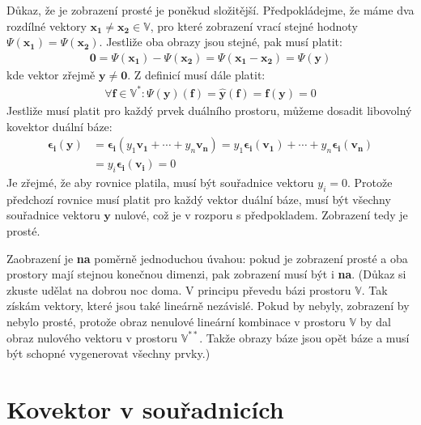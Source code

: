 \documentclass[a5paper,12pt]{amsbook}
\theoremstyle{definition}
\newcommand{\myvec}[1]{\mathbf{#1}}
\newcommand{\myspace}[1]{\mathbb{#1}}
\newcommand{\mydual}[1]{\myspace{#1^{*}}}
\newcommand{\mydouble}[1]{\myspace{#1^{**}}}
\newcommand{\mycocovec}[1]{\myvec{\widehat{#1}}}
\begin{document}
\medskip\noindent
Důkaz, že je zobrazení prosté je poněkud složitější. Předpokládejme, že máme dva rozdílné vektory
$\myvec{x_1}\neq\myvec{x_2}\in\myspace{V}$, pro které zobrazení vrací stejné hodnoty
$\Psi(\myvec{x_1}) = \Psi(\myvec{x_2})$. Jestliže oba obrazy jsou stejné, pak musí platit:
\begin{equation*}
\begin{split}
\myvec{0} = \Psi(\myvec{x_1}) - \Psi(\myvec{x_2}) = \Psi(\myvec{x_1} - \myvec{x_2}) = \Psi(\myvec{y})
\end{split}
\end{equation*}
kde vektor zřejmě $\myvec{y}\neq\myvec{0}$. Z definicí musí dále platit:
\begin{equation*}
\begin{split}
\forall \myvec{f}\in\mydual{V}: \Psi(\myvec{y})(\myvec{f}) = \mycocovec{y}(\myvec{f}) 
    = \myvec{f}(\myvec{y}) = 0
\end{split}
\end{equation*}
Jestliže musí platit pro každý prvek duálního prostoru, můžeme dosadit libovolný kovektor
duální báze:
\begin{equation*}
\begin{split}
\myvec{\epsilon_i}(\myvec{y}) &= \myvec{\epsilon_i}(y_{1}\myvec{v_1} + \cdots + y_{n}\myvec{v_n})
    = y_{1}\myvec{\epsilon_i}(\myvec{v_1}) + \cdots + y_{n}\myvec{\epsilon_i}(\myvec{v_n}) \\
    &= y_{i}\myvec{\epsilon_i}(\myvec{v_i}) = 0
\end{split}
\end{equation*}
Je zřejmé, že aby rovnice platila, musí být souřadnice vektoru $y_i = 0$. Protože předchozí rovnice
musí platit pro každý vektor duální báze, musí být všechny souřadnice vektoru $\myvec{y}$ nulové,
což je v rozporu s předpokladem. Zobrazení tedy je prosté.

\medskip\noindent
Zaobrazení je \textbf{na} poměrně jednoduchou úvahou: pokud je zobrazení prosté a oba prostory
mají stejnou konečnou dimenzi, pak zobrazení musí být i \textbf{na}. (Důkaz si zkuste udělat
na dobrou noc doma. V principu převedu bázi prostoru $\myspace{V}$. Tak získám vektory, které
jsou také lineárně nezávislé. Pokud by nebyly, zobrazení by nebylo prosté, protože obraz
nenulové lineární kombinace v prostoru $\myspace{V}$ by dal obraz nulového vektoru v prostoru
$\mydouble{V}$. Takže obrazy báze jsou opět báze a musí být schopné vygenerovat všechny prvky.)

\section{Kovektor v souřadnicích}
\end{document}
